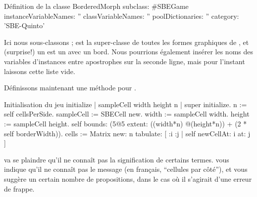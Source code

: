 \documentclass[a4paper,10pt,twoside]{book}
\begin{document}
\begin{classdef}[sbegame]{Définition de la classe }
BorderedMorph subclass: #SBEGame
   instanceVariableNames: ''
   classVariableNames: ''
   poolDictionaries: ''
   category: 'SBE-Quinto'
\end{classdef}

Ici nous sous-classons ;  est la
super-classe de toutes les formes graphiques de \sq, et (surprise!)
un  est un  avec un bord.  
Nous pourrions également insérer les noms des variables d'instances
entre apostrophes sur la seconde ligne, mais pour l'instant 
laissons cette liste vide.

Définissons maintenant une méthode  pour .


\begin{numMethod}[sbegameinitialize]{Initialisation du jeu}
initialize
   | sampleCell width height n |
   super initialize.
   n := self cellsPerSide.
   sampleCell := SBECell new.
   width := sampleCell width.
   height := sampleCell height.
   self bounds: (5@5 extent: ((width*n) @(height*n)) + (2 * self borderWidth)).
   cells := Matrix new: n tabulate: [ :i :j | self newCellAt: i at: j ]
\end{numMethod}


\sq va se plaindre qu'il ne conna\^it pas la signification de
certains termes.
\sq vous indique qu'il ne conna\^it pas le message
 (en fran\c{c}ais, ``cellules par c\^ot\'e''), et
vous suggère un certain nombre de propositions, dans le cas où il
s'agirait d'une erreur de frappe.
\end{document}
